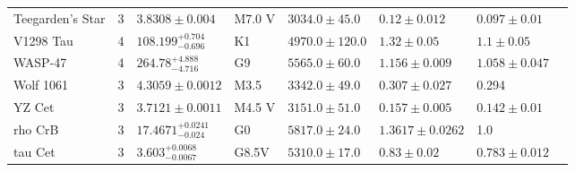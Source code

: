 \begin{tabular}{lrllllll}
Teegarden's Star & 3 & $3.8308 \pm 0.004$ & M7.0 V & $3034.0 \pm 45.0$ & $0.12 \pm 0.012$ & $0.097 \pm 0.01$ & \cite{DREIZLER_ET_AL_2024} \\
V1298 Tau & 4 & $108.199^{+0.704}_{-0.696}$ & K1 & $4970.0 \pm 120.0$ & $1.32 \pm 0.05$ & $1.1 \pm 0.05$ & \cite{LIVINGSTON_ET_AL_2026} \\
WASP-47 & 4 & $264.78^{+4.888}_{-4.716}$ & G9 & $5565.0 \pm 60.0$ & $1.156 \pm 0.009$ & $1.058 \pm 0.047$ & \cite{ADAMS_ET_AL__2021} \\
Wolf 1061 & 3 & $4.3059 \pm 0.0012$ & M3.5 & $3342.0 \pm 49.0$ & $0.307 \pm 0.027$ & 0.294 & \cite{ASTUDILLO_DEFRU_ET_AL__2017} \\
YZ Cet & 3 & $3.7121 \pm 0.0011$ & M4.5 V & $3151.0 \pm 51.0$ & $0.157 \pm 0.005$ & $0.142 \pm 0.01$ & \cite{STOCK_ET_AL__2020} \\
rho CrB & 3 & $17.4671^{+0.0241}_{-0.024}$ & G0 & $5817.0 \pm 24.0$ & $1.3617 \pm 0.0262$ & 1.0 & \cite{BREWER_ET_AL_2023} \\
tau Cet & 3 & $3.603^{+0.0068}_{-0.0067}$ & G8.5V & $5310.0 \pm 17.0$ & $0.83 \pm 0.02$ & $0.783 \pm 0.012$ & \cite{SOUSA_ET_AL__2008} \\
\bottomrule
\end{tabular}
